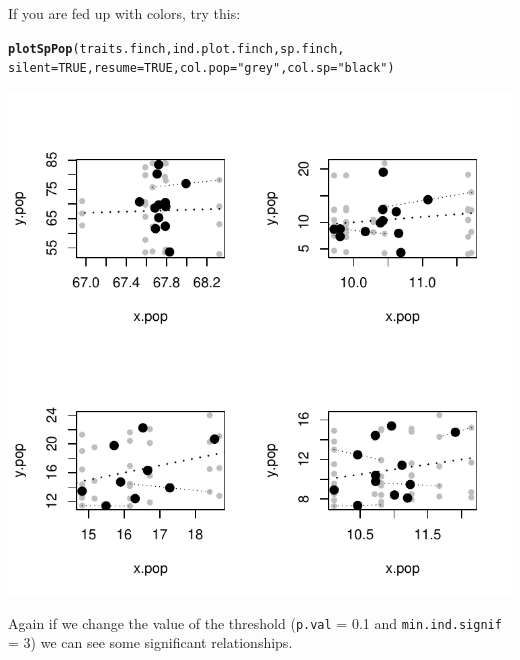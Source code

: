 \documentclass[12pt]{article}\usepackage[]{graphicx}\usepackage[]{color}
\makeatletter
\def\maxwidth{ %
  \ifdim\Gin@nat@width>\linewidth
    \linewidth
  \else
    \Gin@nat@width
  \fi
}
\newcommand{\hlnum}[1]{\textcolor[rgb]{0.686,0.059,0.569}{#1}}%
\newcommand{\hlstr}[1]{\textcolor[rgb]{0.192,0.494,0.8}{#1}}%
\newcommand{\hlstd}[1]{\textcolor[rgb]{0.345,0.345,0.345}{#1}}%
\newcommand{\hlkwc}[1]{\textcolor[rgb]{0.333,0.667,0.333}{#1}}%
\newcommand{\hlkwd}[1]{\textcolor[rgb]{0.737,0.353,0.396}{\textbf{#1}}}%
\newenvironment{kframe}{%
 \def\at@end@of@kframe{}%
 \ifinner\ifhmode%
  \def\at@end@of@kframe{\end{minipage}}%
  \begin{minipage}{\columnwidth}%
 \fi\fi%
 \def\FrameCommand##1{\hskip\@totalleftmargin \hskip-\fboxsep
 \colorbox{shadecolor}{##1}\hskip-\fboxsep
     \hskip-\linewidth \hskip-\@totalleftmargin \hskip\columnwidth}%
 \MakeFramed {\advance\hsize-\width
   \@totalleftmargin\z@ \linewidth\hsize
   \@setminipage}}%
 {\par\unskip\endMakeFramed%
 \at@end@of@kframe}
\newenvironment{knitrout}{}{} %
\makeatother
\begin{document}
If you are fed up with colors, try this:
\begin{knitrout}
\color{fgcolor}\begin{kframe}
\begin{alltt}
\hlkwd{plotSpPop}\hlstd{(traits.finch, ind.plot.finch, sp.finch,}
      \hlkwc{silent} \hlstd{=} \hlnum{TRUE}\hlstd{,} \hlkwc{resume} \hlstd{=} \hlnum{TRUE}\hlstd{,} \hlkwc{col.pop} \hlstd{=} \hlstr{"grey"}\hlstd{,} \hlkwc{col.sp} \hlstd{=} \hlstr{"black"}\hlstd{)}
\end{alltt}
\end{kframe}

{\centering \includegraphics[width=\maxwidth]{figure/unnamed-chunk-30-1} 

}



\end{knitrout}

Again if we change the value of the threshold (\texttt{p.val} = 0.1 and \texttt{min.ind.signif} = 3) we can see some significant relationships.
\end{document}
